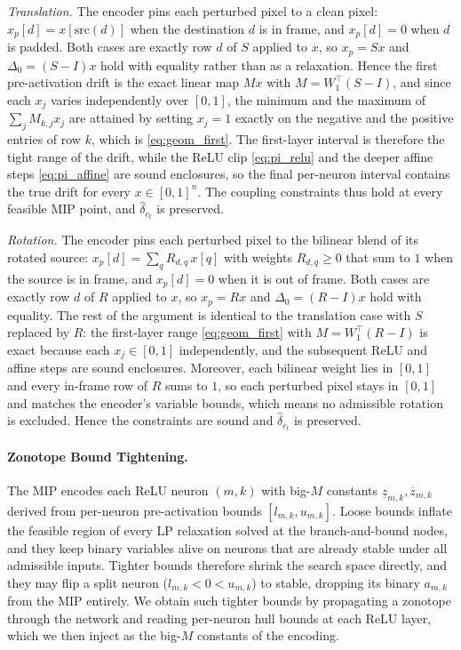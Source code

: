 \documentclass[11pt]{article}
\begin{document}
\emph{Translation.} The encoder pins each perturbed pixel to a clean pixel: $x_p[d] = x[\mathrm{src}(d)]$ when the destination $d$ is in frame, and $x_p[d] = 0$ when $d$ is padded. Both cases are exactly row $d$ of $S$ applied to $x$, so $x_p = S x$ and $\Delta_0 = (S - I)x$ hold with equality rather than as a relaxation. Hence the first pre-activation drift is the exact linear map $M x$ with $M = W_1^\top (S - I)$, and since each $x_j$ varies independently over $[0,1]$, the minimum and the maximum of $\sum_j M_{k,j} x_j$ are attained by setting $x_j = 1$ exactly on the negative and the positive entries of row $k$, which is \eqref{eq:geom_first}. The first-layer interval is therefore the tight range of the drift, while the ReLU clip \eqref{eq:pi_relu} and the deeper affine steps \eqref{eq:pi_affine} are sound enclosures, so the final per-neuron interval contains the true drift for every $x \in [0,1]^n$. The coupling constraints thus hold at every feasible MIP point, and $\hat{\delta}_{c_t}$ is preserved.

\emph{Rotation.} The encoder pins each perturbed pixel to the bilinear blend of its rotated source: $x_p[d] = \sum_{q} R_{d,q}\, x[q]$ with weights $R_{d,q} \ge 0$ that sum to $1$ when the source is in frame, and $x_p[d] = 0$ when it is out of frame. Both cases are exactly row $d$ of $R$ applied to $x$, so $x_p = R x$ and $\Delta_0 = (R - I)x$ hold with equality. The rest of the argument is identical to the translation case with $S$ replaced by $R$: the first-layer range \eqref{eq:geom_first} with $M = W_1^\top (R - I)$ is exact because each $x_j \in [0,1]$ independently, and the subsequent ReLU and affine steps are sound enclosures. Moreover, each bilinear weight lies in $[0,1]$ and every in-frame row of $R$ sums to $1$, so each perturbed pixel stays in $[0,1]$ and matches the encoder's variable bounds, which means no admissible rotation is excluded. Hence the constraints are sound and $\hat{\delta}_{c_t}$ is preserved.

\paragraph{Zonotope Bound Tightening.}
\label{sec:tech:zono}

The MIP encodes each ReLU neuron $(m,k)$ with big-$M$ constants $\underline z_{m,k}, \overline z_{m,k}$ derived from per-neuron pre-activation bounds $[l_{m,k}, u_{m,k}]$. Loose bounds inflate the feasible region of every LP relaxation solved at the branch-and-bound nodes, and they keep binary variables alive on neurons that are already stable under all admissible inputs. Tighter bounds therefore shrink the search space directly, and they may flip a split neuron ($l_{m,k} < 0 < u_{m,k}$) to stable, dropping its binary $a_{m,k}$ from the MIP entirely. We obtain such tighter bounds by propagating a zonotope through the network and reading per-neuron hull bounds at each ReLU layer, which we then inject as the big-$M$ constants of the encoding.
\end{document}
